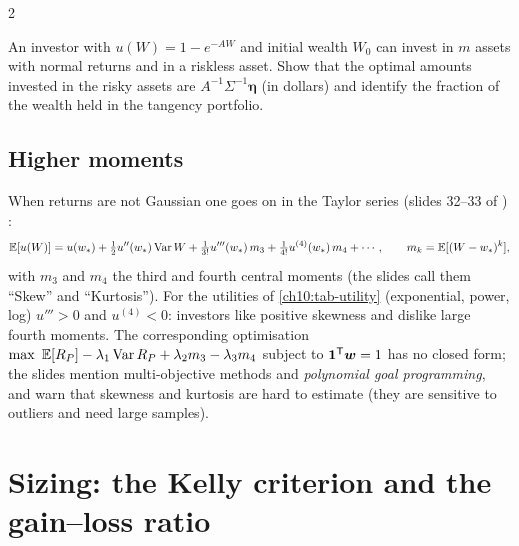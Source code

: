 \begin{paracol}{2}
\begin{exercise}
An investor with $u(W)=1-e^{-AW}$ and initial wealth $W_0$ can invest in $m$ assets with normal returns and in a riskless asset. Show that the
optimal amounts invested in the risky assets are $A^{-1}\Sigma^{-1}\bm\eta$ (in dollars) and identify the fraction of the wealth held in the
tangency portfolio.
\end{exercise}

\subsection{Higher moments}
When returns are not Gaussian one goes on in the Taylor series (slides 32--33 of )
:
\[
  \mathbb{E}[u(W)]=u(w_*)+\tfrac12u''(w_*)\operatorname{Var} W+\tfrac1{3!}u'''(w_*)\,m_3+\tfrac1{4!}u^{(4)}(w_*)\,m_4+\cdots,\qquad m_k=\mathbb{E}[(W-w_*)^k],
\]
with $m_3$ and $m_4$ the third and fourth central moments (the slides call them ``Skew'' and ``Kurtosis''). For
the utilities of \cref{ch10:tab-utility} (exponential, power, log) $u'''>0$ and $u^{(4)}<0$: investors like positive
skewness and dislike large fourth moments. The corresponding optimisation
$\max\ \E[R_P]-\lambda_1\Var R_P+\lambda_2m_3-\lambda_3m_4$ subject to $\bm 1^{\mathsf T}\bm w=1$ has no closed form; the slides mention
multi-objective methods and \emph{polynomial goal programming}, and warn that skewness and kurtosis are hard
to estimate (they are sensitive to outliers and need large samples).

\section{Sizing: the Kelly criterion and the gain--loss ratio}\label{ch10:sec-kelly}


\end{paracol}
